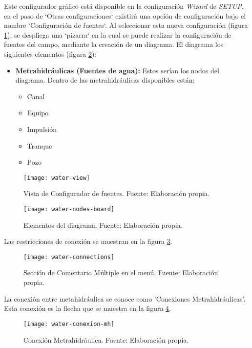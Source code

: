 Este configurador gráfico está disponible en la configuración \textit{Wizard} de \textit{SETUP}, en el paso de `Otras configuraciones` existirá una opción de configuración bajo el nombre `Configuración de fuentes`.
Al seleccionar esta nueva configuración (figura \ref{fig:water-view}), se despliega una `pizarra` en la cual se puede realizar la configuración de fuentes del campo, mediante la creación de un diagrama. El diagrama los siguientes elementos (figura \ref{fig:water-nodes-board}):
\begin{itemize}
    \item \textbf{Metrahidráulicas (Fuentes de agua):} Estos serían los nodos del diagrama. Dentro de las metrahidráulicas disponibles están:
          \begin{itemize}
              \item Canal
              \item Equipo
              \item Impulsión
              \item Tranque
              \item Pozo
          \end{itemize}   
\end{itemize}

\begin{figure}[H]
	\centering
	\texttt{[image: water-view]}
	\caption{\label{fig:water-view} Vista de Configurador de fuentes. Fuente: Elaboración propia.}
\end{figure}

\begin{figure}[H]
	\centering
	\texttt{[image: water-nodes-board]}
	\caption{\label{fig:water-nodes-board} Elementos del diagrama. Fuente: Elaboración propia.}
\end{figure}

Las restricciones de conexión se muestran en la figura \ref{fig:water-connections}.

\begin{figure}[H]
	\centering
	\texttt{[image: water-connections]}
	\caption{\label{fig:water-connections} Sección de Comentario Múltiple en el menú. Fuente: Elaboración propia.}
\end{figure}

La conexión entre metahidráulica se conoce como 'Conexiones Metrahidráulicas'. Esta conexión es la flecha que se muestra en la figura \ref{fig:water-conexion-mh}.

\begin{figure}[H]
	\centering
	\texttt{[image: water-conexion-mh]}
	\caption{\label{fig:water-conexion-mh} Conexión Metrahidráulica. Fuente: Elaboración propia.}
\end{figure}

